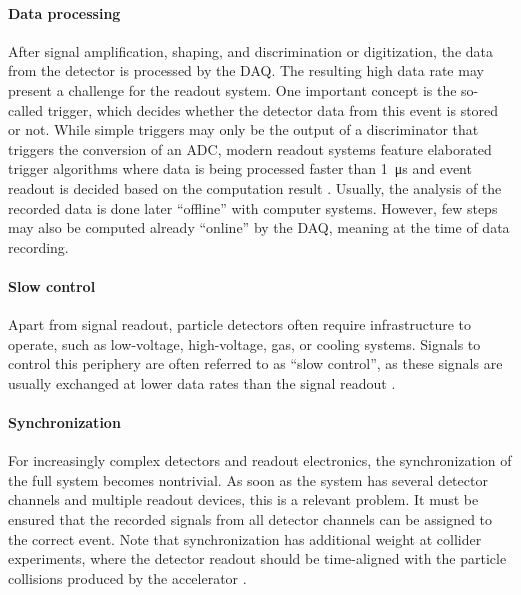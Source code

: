 \paragraph{Data processing}
After signal amplification, shaping, and discrimination or digitization, the data from the detector is processed by the \ac{DAQ}. The resulting high data rate may present a challenge for the readout system. One important concept is the so-called trigger, which decides whether the detector data from this event is stored or not. While simple triggers may only be the output of a discriminator that triggers the conversion of an \ac{ADC}, modern readout systems feature elaborated trigger algorithms where data is being processed faster than \SI{1}{\micro\second} and event readout is decided based on the computation result \cite{Book-KolanoskiWermes}. Usually, the analysis of the recorded data is done later \enquote{offline} with computer systems. However, few steps may also be computed already \enquote{online} by the \ac{DAQ}, meaning at the time of data recording.
\paragraph{Slow control}
Apart from signal readout, particle detectors often require infrastructure to operate, such as low-voltage, high-voltage, gas, or cooling systems. Signals to control this periphery are often referred to as \enquote{slow control}, as these signals are usually exchanged at lower data rates than the signal readout \cite{Book-KolanoskiWermes}.
\paragraph{Synchronization}
For increasingly complex detectors and readout electronics, the synchronization of the full system becomes nontrivial. As soon as the system has several detector channels and multiple readout devices, this is a relevant problem. It must be ensured that the recorded signals from all detector channels can be assigned to the correct event. Note that synchronization has additional weight at collider experiments, where the detector readout should be time-aligned with the particle collisions produced by the accelerator \cite{Book-KolanoskiWermes}.

